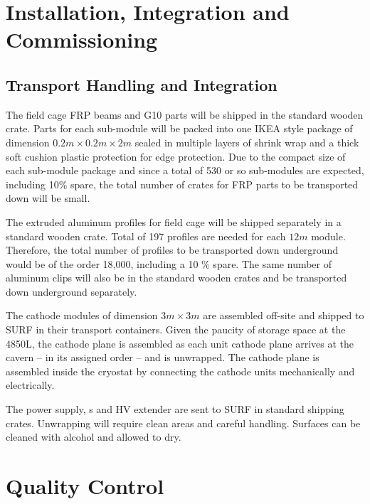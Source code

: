 \section{Installation, Integration and Commissioning}
\label{sec:fddp-hv-install}

\subsection{Transport Handling and Integration}
\label{sec:fddp-hv-install-transport}



The field cage FRP beams and G10 parts will be shipped in the standard wooden crate.  Parts for each sub-module will be packed into one IKEA style package of dimension $0.2m\times 0.2m\times 2m$ sealed in multiple layers of shrink wrap and a thick soft cushion plastic protection for edge protection.   Due to the compact size of each sub-module package and since a total of 530 or so sub-modules are expected, including 10\% spare, the total number of crates for FRP parts to be transported down will be small.

The extruded aluminum profiles for field cage will be shipped separately in a standard wooden crate.  Total of 197 profiles are needed for each $12m$ module. Therefore, the total number of profiles to be transported down underground would be of the order 18,000, including a 10
\% spare.  The same number of aluminum clips will also be in the standard wooden crates and be transported down underground separately. 


The cathode modules of dimension $3m\times 3m$ are assembled off-site and shipped to SURF in their transport containers. Given the paucity of storage space at the 4850L, the cathode plane is assembled as each unit cathode plane arrives at the cavern -- in its assigned order -- and is unwrapped. The cathode plane is assembled inside the cryostat by connecting the cathode units mechanically and electrically. 


The power supply, \fdth{}s and HV extender are sent to SURF in standard shipping crates. Unwrapping  will require  clean areas and careful handling. Surfaces can be cleaned with alcohol and allowed to dry.


\section{Quality Control}
\label{sec:fddp-hv-qc}

